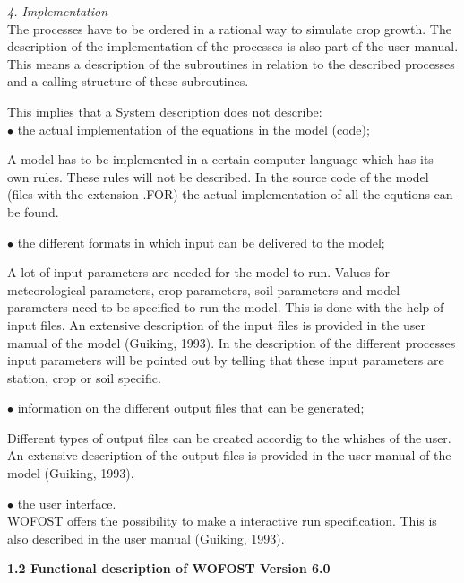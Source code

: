 \documentclass[11pt]{article}
\begin{document}
{\it 4. Implementation\/}\\
The processes have to be ordered in a rational way to simulate crop growth. The
description of the implementation of the processes is also part of the user manual.
This means a description of the subroutines in relation to the described processes and
a calling structure of these subroutines.  

This implies that a System description does not describe: \\
$\bullet$ the actual implementation of the equations in the model (code);

\zerotestlastline
\begin{indenting}{1.27cm}
A model has to be implemented in a certain computer language which has its
own rules. These rules will not be described. In the source code of the model 
(files with the extension .FOR) the actual implementation of all the equtions
can be found.
\end{indenting}
$\bullet$ the different formats in which input can be delivered to the model;

\zerotestlastline
\begin{indenting}{1.27cm}
A lot of input parameters are needed for the model to run. Values for
meteorological parameters, crop parameters, soil parameters and model
parameters need to be specified to run the model. This is done with the help
of input files. An extensive description of the input files is provided in the user
manual of the model (Guiking, 1993). In the description of the different
processes input parameters will be pointed out by telling that these input
parameters are station, crop or soil specific.   
\end{indenting}
$\bullet$ information on the different output files that can be generated;

\zerotestlastline
\begin{indenting}{1.27cm}
Different types of output files can be created accordig to the whishes of the
user. An extensive description of the output files is provided in the user
manual of the model (Guiking, 1993). 
\end{indenting}
$\bullet$ the user interface. \\
\hspace*{1.28cm}WOFOST offers the possibility to make a interactive run specification. This is
also described in the user manual (Guiking, 1993).

\bigskip
\bigskip
{\bf 1.2 Functional description of WOFOST Version 6.0}
\end{document}
